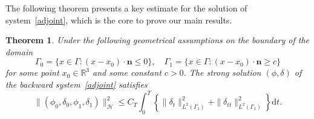 \documentclass[10pt]{elsarticle}
\newtheorem{theorem}{Theorem}
\begin{document}
The following theorem presents a key estimate for the solution of system~\eqref{adjoint}, which is the core to prove our main results.
\begin{theorem}\label{observability}
Under the following geometrical assumptions on the boundary of the domain
\begin{equation} \label{G1}
	\Gamma_0 =\{x\in\Gamma: (x-x_0)\cdot\mathbf{n}\leq 0 \},\quad \Gamma_1 =\{x\in\Gamma: (x-x_0)\cdot\mathbf{n}\geq c \}
\end{equation}
for some point $x_0\in\mathbb{R}^3$ and some constant $c>0$. The strong solution $(\phi, \delta)$ of the backward system~\eqref{adjoint} satisfies
\begin{equation} \label{ineq:obs_abc}
	\|(\phi_0, \delta_0, \phi_1, \delta_1)\|^2_{\mathcal{H}} \leqslant C_{T}\int_{0}^{T}\left\{ \|\delta_t\|^2_{L^2(\Gamma_1)}+\|\delta_{tt}\|^2_{L^2(\Gamma_1)}\right\}\mathrm{d}t.
\end{equation}
\end{theorem}
\end{document}
